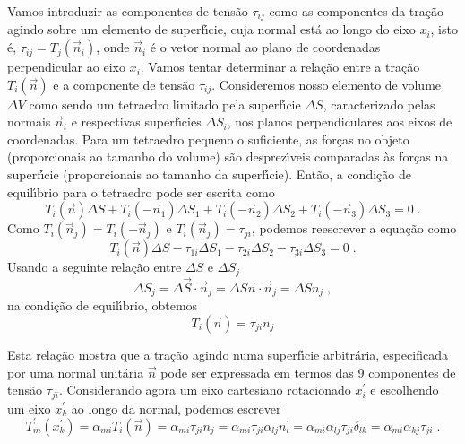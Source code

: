 Vamos introduzir as componentes de tens\~ao $\tau_{ij}$ como as
componentes da tra\c{c}\~ao agindo sobre um elemento de
superf\'{\i}cie, cuja normal est\'a ao longo do eixo $x_i$, isto
\'e, $\tau_{ij}=T_j(\vec{n}_i)$, onde $\vec{n}_i$ \'e o vetor normal ao
plano de coordenadas perpendicular ao eixo $x_i$. Vamos tentar determinar a
rela\c{c}\~ao entre a tra\c{c}\~ao $T_i(\vec{n})$ e a componente
de tens\~ao $\tau_{ij}$. Consideremos nosso elemento de volume
$\Delta V$ como sendo um tetraedro limitado pela superf\'{\i}cie
$\Delta S$, caracterizado pelas normais $\vec{n}_i$ e respectivas
superf\'{\i}cies $\Delta S_i$, nos planos perpendiculares aos
eixos de coordenadas. Para um tetraedro pequeno o suficiente, as
for\c{c}as no objeto (proporcionais ao tamanho do volume) s\~ao
desprez\'{\i}veis comparadas \`as for\c{c}as na superf\'{\i}cie
(proporcionais ao tamanho da superf\'{\i}cie). Ent\~ao, a
condi\c{c}\~ao de equil\'{\i}brio para o tetraedro pode ser
escrita como
\begin{equation}
T_i(\vec{n}) \Delta S + T_i(-\vec{n}_1) \Delta S_1 +
T_i(-\vec{n}_2) \Delta S_2 + T_i(-\vec{n}_3) \Delta S_3 = 0 \;.
\end{equation}
Como $T_i(\vec{n}_j)=T_i(-\vec{n}_j)$ e
$T_i(\vec{n}_j)=\tau_{ji}$, podemos reescrever a equa\c{c}\~ao
como
\begin{equation}
T_i(\vec{n}) \Delta S - \tau_{1i} \Delta S_1 - \tau_{2i} \Delta
S_2 - \tau_{3i} \Delta S_3 = 0 \;.
\end{equation}
Usando a seguinte rela\c{c}\~ao entre $\Delta S$ e $\Delta S_j$
\begin{equation}
\Delta S_j=\Delta \vec{S} \cdot \vec{n}_j = \Delta S \vec{n} \cdot \vec{n}_j =
\Delta S n_j \;,
\end{equation}
na condi\c{c}\~ao de equil\'{\i}brio, obtemos
\begin{equation}
T_i(\vec{n}) = \tau_{ji} n_j \label{cond_equil}
\end{equation}


Esta rela\c{c}\~ao mostra que a tra\c{c}\~ao agindo numa
superf\'{\i}cie arbitr\'aria, especificada por uma normal
unit\'aria $\vec{n}$ pode ser expressada em termos das 9
componentes de tens\~ao $\tau_{ji}$. Considerando agora um  eixo
cartesiano rotacionado $x^{'}_i$ e escolhendo um eixo $x^{'}_k$ ao
longo da normal, podemos escrever
\begin{equation}
T^{'}_m(x^{'}_k) = \alpha_{mi} T_i(\vec{n}) = \alpha_{mi}
\tau_{ji} n_j = \alpha_{mi} \tau_{ji} \alpha_{lj} n^{'}_l =
\alpha_{mi} \alpha_{lj} \tau_{ji} \delta_{lk} = \alpha_{mi}
\alpha_{kj} \tau_{ji} \;.
\end{equation}

